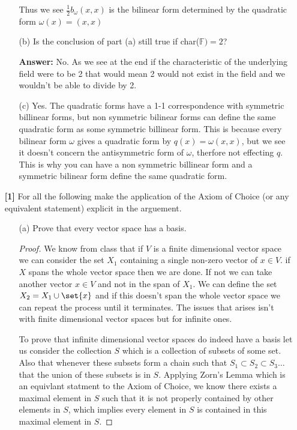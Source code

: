 \documentclass[12pt]{article}
\DeclarePairedDelimiter\set\{\}
\newcommand      {\Fm}          {{\mathbb F}}
\begin{document}
\begin{itemize}
\begin{itemize}
        Thus we see $\frac{1}{2}b_\omega(x,x)$ is the bilinear form determined by the quadratic form $\omega(x) = (x,x)$

        \item[(b)] Is the conclusion of part (a) still true if char($\Fm)=2$?
        
        \textbf{Answer:} No. As we see at the end if the characteristic of the underlying field were to be 2 that would mean 2 would not exist in the field and we wouldn't be able to divide by 2.    
        \newpage
        \item[(c)] Yes. The quadratic forms have a 1-1 correspondence with symmetric billinear forms, but non symmetric bilinear forms can define the same quadratic form as some symmetric billinear form. This is because every bilinear form $\omega$ gives a quadratic form by $q(x) = \omega(x,x)$, but we see it doesn't concern the antisymmetric form of $\omega$, therfore not effecting $q$. This is why you can have a non symmetric billinear form and a symmetric bilinear form define the same quadratic form. 
    \end{itemize}

    \item[\textbf{[1]}] For all the following make the application of the Axiom of Choice (or any equivalent statement) explicit in the arguement.
    \begin{itemize}
        \item[(a)] Prove that every vector space has a basis.
        \begin{proof}
            We know from class that if $V$ is a finite dimensional vector space we can consider the set $X_1$  containing a single non-zero vector of $x\in V$. if $X$ spans the whole vector space then we are done. If not we can take another vector $x\in V$ and not in the span of $X_1$. We can define the set $X_2 = X_1 \cup \set{x} $ and if this doesn't span the whole vector space we can repeat the process until it terminates. The issues that arises isn't with finite dimensional vector spaces but for infinite ones.

            To prove that infinite dimensional vector spaces do indeed have a basis let us consider the collection $S$ which is a collection of subsets of some set. Also that whenever these subsets form a chain such that $S_1 \subset S_2 \subset S_3 \dots$ that the union of these subsets is in $S$. Applying Zorn's Lemma which is an equivlant statment to the Axiom of Choice, we know there exists a maximal element in $S$ such that it is not properly contained by other elements in $S$, which implies every element in $S$ is contained in this maximal element in $S$. 


\end{proof}
\end{itemize}
\end{itemize}
\end{document}
